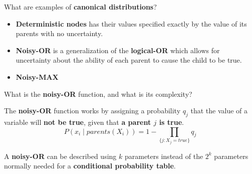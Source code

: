 \begin{flashcard}[Question]{What are examples of \textbf{canonical distributions}?}
\begin{itemize}
\item \textbf{Deterministic nodes} has their values specified exactly by the value of its parents with no uncertainty.
\item \textbf{Noisy-OR} is a generalization of the \textbf{logical-OR} which allows for uncertainty about the ability of each parent to cause the child to be true.
\item \textbf{Noisy-MAX}
\end{itemize}
\end{flashcard}

\begin{flashcard}[Question]{What is the \textbf{noisy-OR} function, and what is its complexity?}
\begin{center}
The \textbf{noisy-OR} function works by assigning a probability $q_j$ that the value of a variable will \textbf{not be true}, given that \textbf{a parent $j$ is true}.
\begin{displaymath}
P(x_i \mid \textit{parents}(X_i)) = 1 - \prod_{\{j:X_j = \textit{true}\}}q_j
\end{displaymath}

\medskip

A \textbf{noisy-OR} can be described using $k$ parameters instead of the $2^k$ parameters normally needed for a \textbf{conditional probability table}.
\end{center}
\end{flashcard}

